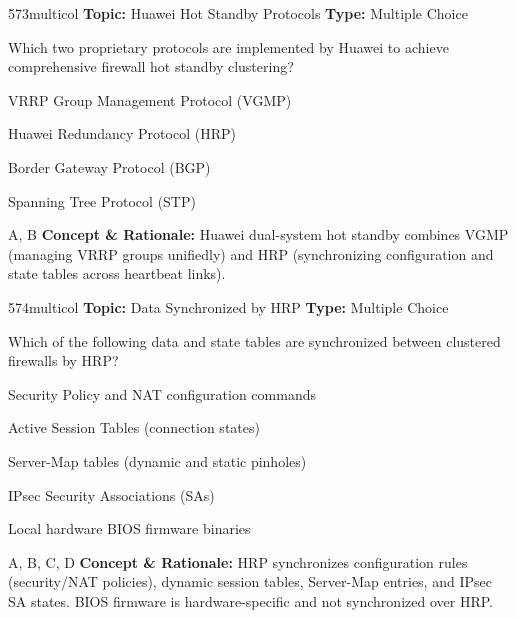 \begin{qcard}{573}{multicol}
\textcolor{darkslate!75}{\small\textbf{Topic:} Huawei Hot Standby Protocols \hfill \textbf{Type:} Multiple Choice}\vspace{0.4em}\par
Which two proprietary protocols are implemented by Huawei to achieve comprehensive firewall hot standby clustering?
\begin{qoptions}
\item VRRP Group Management Protocol (VGMP)
\item Huawei Redundancy Protocol (HRP)
\item Border Gateway Protocol (BGP)
\item Spanning Tree Protocol (STP)
\end{qoptions}
\end{qcard}
\nopagebreak
\begin{explainbox}{A, B}
\textbf{Concept \& Rationale:} Huawei dual-system hot standby combines VGMP (managing VRRP groups unifiedly) and HRP (synchronizing configuration and state tables across heartbeat links).
\end{explainbox}

\begin{qcard}{574}{multicol}
\textcolor{darkslate!75}{\small\textbf{Topic:} Data Synchronized by HRP \hfill \textbf{Type:} Multiple Choice}\vspace{0.4em}\par
Which of the following data and state tables are synchronized between clustered firewalls by HRP?
\begin{qoptions}
\item Security Policy and NAT configuration commands
\item Active Session Tables (connection states)
\item Server-Map tables (dynamic and static pinholes)
\item IPsec Security Associations (SAs)
\item Local hardware BIOS firmware binaries
\end{qoptions}
\end{qcard}
\nopagebreak
\begin{explainbox}{A, B, C, D}
\textbf{Concept \& Rationale:} HRP synchronizes configuration rules (security/NAT policies), dynamic session tables, Server-Map entries, and IPsec SA states. BIOS firmware is hardware-specific and not synchronized over HRP.
\end{explainbox}

